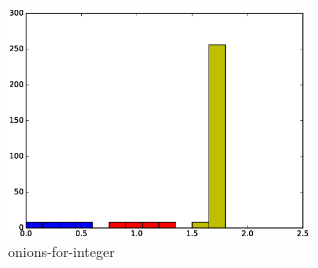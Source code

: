 



\begin{figure}[tb]
\centering
\includegraphics[width=8cm]{images/onion-for-integer.eps}
\caption{onions-for-integer}
\label{fig:stack6}
\end{figure}





